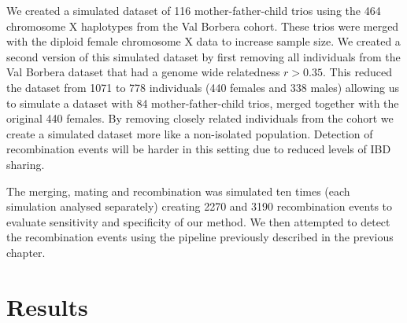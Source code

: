 We created a simulated dataset of 116 mother-father-child trios using the 464 chromosome X haplotypes from the Val Borbera cohort. These trios were merged with the diploid female chromosome X data to increase sample size. We created a second version of this simulated dataset by first removing all individuals from the Val Borbera dataset that had a genome wide relatedness $r>0.35$. This reduced the dataset from 1071 to 778 individuals (440 females and 338 males) allowing us to simulate a dataset with 84 mother-father-child trios, merged together with the original 440 females. By removing closely related individuals from the cohort we create a simulated dataset more like a non-isolated population. Detection of recombination events will be harder in this setting due to reduced levels of IBD sharing.

The merging, mating and recombination was simulated ten times (each simulation analysed separately) creating 2270 and 3190 recombination events to evaluate sensitivity and specificity of our method. We then attempted to detect the recombination events using the pipeline previously described in the previous chapter.


\section{Results}

